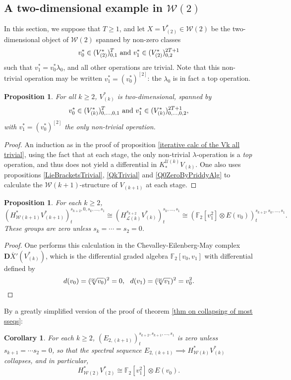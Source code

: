 \documentclass[11pt]{amsart}
\theoremstyle{plain}
\newtheorem{prop}[thm]{Proposition}
\newtheorem{cor}[thm]{Corollary}
\theoremstyle{definition}
\newcommand{\calU}{\mathcal{U}}
\newcommand{\calL}{\mathcal{L}}
\newcommand{\calw}{\mathcal{W}}
\theoremstyle{plain}
\newcommand{\restn}[1]{#1^{[2]}}
\newcommand{\dualrestn}[1]{\sqrt[{[2]}]{#1}}
\renewcommand{\dualrestn}[1]{\sqrt[{\!\!\![2]}]{#1}}
\newcommand{\UEAX}{\overline{X}'}%
\newcommand{\F}{\mathbb{F}}
\newcommand{\Ftwo}{\F_2}
\newcommand{\dual}{\mathbf{D}}
\begin{document}
\begin{Calculations of HWn for n nonzero}
\subsection{A two-dimensional example in $\calw(2)$}
In this section, we suppose that $T\geq1$, and let $X=V^*_{(2)}\in\calw(2)$ be the two-dimensional object of $\calw(2)$ spanned by non-zero classes 
\[v_{0}^{*}\in (V^*_{(2)})^{T}_{0,1}\textup{ and }v_{1}^{*}\in (V^*_{(2)})^{2T+1}_{0,2}\]
such that $v^*_{1}=v^*_0\lambda_{0}$, and all other operations are trivial. Note that this non-trivial operation may be written $v^*_{1}=\restn{(v^*_0)}$: the $\lambda_0$ is in fact a top operation.
\begin{prop}\label{2d example in w2}
For all $k\geq2$, $V^*_{(k)}$ is two-dimensional, spanned by
\[v_{0}^{*}\in (V^*_{(k)})^{T}_{0,\ldots,0,1}\textup{ and }v_{1}^{*}\in (V^*_{(k)})^{2T+1}_{0,\ldots,0,2},\]
with  $v^*_{1}=\restn{(v^*_0)}$ the only non-trivial operation.
\end{prop}
\begin{proof}
An induction as in the proof of proposition \ref{iterative calc of the Vk all trivial}, using the fact that at each stage, the only non-trivial $\lambda$-operation is a \emph{top} operation, and thus does not yield a differential in $K_*^{\calU(k)}V_{(k)}$. One also uses propositions \ref{LieBracketsTrivial}, \ref{QkTrivial} and \ref{Q0ZeroByPriddyAlg} to calculate the $\calw(k+1)$-structure of $V_{(k+1)}$ at each stage.
\end{proof}
\begin{prop}
For each $k\geq2$,
\[(H^*_{\calw(k+1)}V^*_{(k+1)})^{s_{k+2},0,s_k,\ldots,s_1}_{t}\cong (H^{s_{k+2}}_{\calL(k)}V^*_{(k)})^{s_k,\ldots,s_1}_t\cong (\Ftwo [v_1^{2}]\otimes E(v_0))_t^{s_{k+2},s_{k},\ldots,s_1}.\]
These groups are zero unless $s_k=\cdots =s_2=0$.
\end{prop}
\begin{proof}
One performs this calculation in the Chevalley-Eilenberg-May complex $\dual\UEAX(V^*_{(k)})$, which is the differential graded algebra $\Ftwo [v_0,v_1]$ with differential defined by
\[d(v_0)=(\dualrestn{v_0})^2=0,\ \ d(v_1)=(\dualrestn{v_1})^2=v_0^2.\qedhere\]
\end{proof}
By a greatly simplified version of the proof of theorem \ref{thm on collapsing of most sseqs}:
\begin{cor}\label{statement of result on 2d w2 example}
For each $k\geq2$, $(E_{2,(k+1)})^{s_{k+2},s_{k+1},\ldots,s_1}_{t}$ is zero unless $s_{k+1}=\cdots s_2=0$, so that the spectral sequence $E_{2,(k+1)}\implies H^*_{\calw(k)}V^*_{(k)}$ collapses, and in particular,
\[H^*_{\calw(2)}V^*_{(2)}\cong \Ftwo [v_1^{2}]\otimes E(v_0).\]
\end{cor}


\end{Calculations of HWn for n nonzero}
\end{document}
